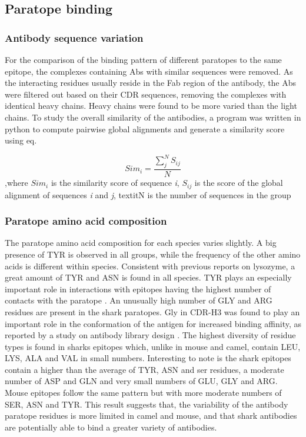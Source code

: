 \documentclass{article}
\begin{document}
\subsection{Paratope binding}
\subsubsection{Antibody sequence variation}

For the comparison of the binding pattern of different paratopes to the same epitope, the complexes containing Abs with similar sequences were removed. As the interacting residues usually reside in the Fab region of the antibody, the Abs were filtered out based on their CDR sequences, removing the complexes with identical heavy chains. Heavy chains were found to be more varied than the light chains. To study the overall similarity of the antibodies, a program was written in python to compute pairwise global alignments and generate a similarity score using eq.

\begin{equation}
Sim_i = \frac{\sum\limits_{j}^{N}S_{ij}}{N}
\end{equation}
,where $ Sim_i $ is the similarity score of sequence \textit{i}, $ S_{ij} $ is the score of the global alignment of sequences \textit{i} and \textit{j}, textit{N} is the number of sequences in the group
			

\subsubsection{Paratope amino acid composition}

The paratope amino acid composition for each species varies slightly. A big presence of TYR is observed in all groups, while the frequency of the other amino acids is different within species. Consistent with previous reports on lysozyme, a great amount of TYR and ASN is found in all species. TYR plays an especially important role in interactions with epitopes having the highest number of contacts with the paratope \cite{Nguyen2017}. An unusually high number of GLY and ARG residues are present in the shark paratopes.  Gly in CDR-H3 was found to play an important role in the conformation of the antigen for increased binding affinity, as reported by a study on antibody library design  \cite{Fellouse2007}. The highest diversity of residue types is found in sharks epitopes which, unlike in mouse and camel, contain LEU, LYS, ALA and VAL in small numbers. Interesting to note is the shark epitopes contain a higher than the average of TYR, ASN and ser residues, a moderate number of ASP and GLN and very small numbers of GLU, GLY and ARG. Mouse epitopes follow the same pattern but with more moderate numbers of SER, ASN and TYR. This result suggests that, the variability of the antibody paratope residues is more limited in camel and mouse, and that shark antibodies are potentially able to bind a greater variety of antibodies.
\end{document}
